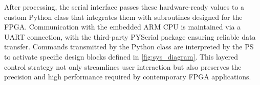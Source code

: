 After processing, the serial interface passes these hardware-ready values to a custom Python class that integrates them with subroutines designed for the FPGA. Communication with the embedded ARM CPU is maintained via a UART connection, with the third-party PYSerial package ensuring reliable data transfer. Commands transmitted by the Python class are interpreted by the PS to activate specific design blocks defined in \autoref{fig:sys_diagram}. This layered control strategy not only streamlines user interaction but also preserves the precision and high performance required by contemporary FPGA applications.